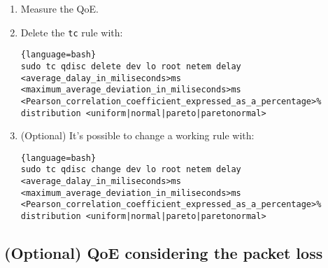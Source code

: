 \begin{enumerate}
  Example:

  \begin{enumerate}
  \item Add the rule:
    
    \begin{lstlisting}{language=bash}
sudo tc qdisc add dev lo root netem delay 100ms 10ms 25% distribution normal
    \end{lstlisting}
    
  \item Check that the rule has been installed with the command:
    
    \begin{lstlisting}{language=bash}
tc qdisc show dev lo
    \end{lstlisting}
    
    that should output (or something very similar):
    
    \begin{lstlisting}{language=bash}
qdisc netem 8009: root refcnt 2 limit 1000 delay 100ms  10ms 25%
    \end{lstlisting}
  \end{enumerate}

\item Measure the QoE.

\item Delete the \verb|tc| rule with:
  
  \begin{lstlisting}{language=bash}
sudo tc qdisc delete dev lo root netem delay <average_dalay_in_miliseconds>ms <maximum_average_deviation_in_miliseconds>ms <Pearson_correlation_coefficient_expressed_as_a_percentage>% distribution <uniform|normal|pareto|paretonormal>
  \end{lstlisting}

\item (Optional) It's possible to change a working rule with:

  \begin{lstlisting}{language=bash}
sudo tc qdisc change dev lo root netem delay <average_dalay_in_miliseconds>ms <maximum_average_deviation_in_miliseconds>ms <Pearson_correlation_coefficient_expressed_as_a_percentage>% distribution <uniform|normal|pareto|paretonormal>
  \end{lstlisting}
  
\end{enumerate}

\subsection{(Optional) QoE considering the packet loss}

